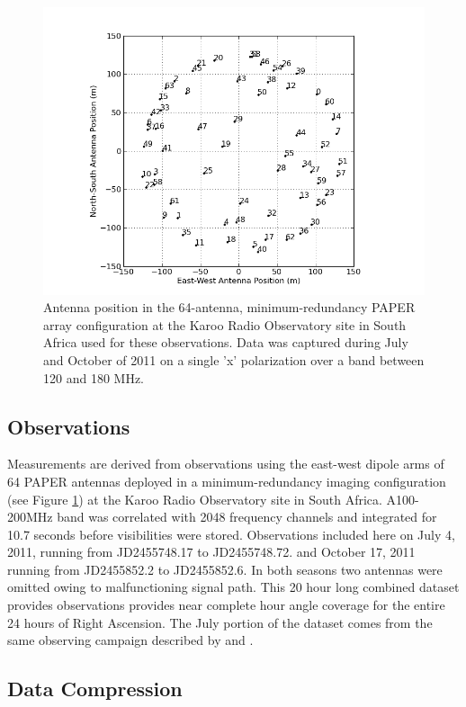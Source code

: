 \documentclass[preprint]{aastex}
\begin{document}
\begin{figure}\centering
\includegraphics[width=0.85\columnwidth]{plots/antpos.png}
\caption{Antenna position in the 64-antenna, minimum-redundancy PAPER array configuration at the Karoo Radio Observatory site in South Africa used for these observations.
Data was captured during July and October of 2011 on a single 'x' polarization over a band between 120 and 180 MHz.
}\label{fig:antpos}
\end{figure}

\subsection{Observations}

 Measurements are derived from observations using  the east-west dipole arms of
64 PAPER antennas deployed in a minimum-redundancy imaging configuration
(see Figure \ref{fig:antpos})
at the Karoo Radio Observatory site in South Africa.
A100-200MHz band was correlated
with 2048 frequency channels and integrated for 10.7 seconds before
visibilities were stored.  Observations included here on  July 4, 2011, running
from JD2455748.17 to JD2455748.72. and October 17, 2011 running from
JD2455852.2 to JD2455852.6.  In both seasons two antennas were omitted owing to
malfunctioning signal path. This 20 hour long combined dataset provides
observations provides near complete hour angle coverage for the entire 24 hours of
Right Ascension. The July portion of the dataset comes from the same observing
campaign described by \cite{Pober:2013p9567} and \cite{Stefan:2012p9707}. 

\subsection{Data Compression}
\end{document}
